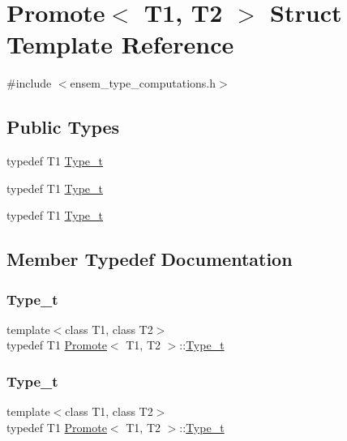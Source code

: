 \hypertarget{structPromote}{}\section{Promote$<$ T1, T2 $>$ Struct Template Reference}
\label{structPromote}


{\ttfamily \#include $<$ensem\+\_\+type\+\_\+computations.\+h$>$}

\subsection*{Public Types}
\begin{DoxyCompactItemize}
\item 
typedef T1 \mbox{\hyperlink{structPromote_a85c0d5fa03b60c087ac52aab76ccb930}{Type\+\_\+t}}
\item 
typedef T1 \mbox{\hyperlink{structPromote_a85c0d5fa03b60c087ac52aab76ccb930}{Type\+\_\+t}}
\item 
typedef T1 \mbox{\hyperlink{structPromote_a85c0d5fa03b60c087ac52aab76ccb930}{Type\+\_\+t}}
\end{DoxyCompactItemize}


\subsection{Member Typedef Documentation}
\mbox{\label{structPromote_a85c0d5fa03b60c087ac52aab76ccb930}} 
\subsubsection{\texorpdfstring{Type\_t}{Type\_t}\hspace{0.1cm}{\footnotesize\ttfamily [1/3]}}
{\footnotesize\ttfamily template$<$class T1, class T2$>$ \\
typedef T1 \mbox{\hyperlink{structPromote}{Promote}}$<$ T1, T2 $>$\+::\mbox{\hyperlink{structPromote_a85c0d5fa03b60c087ac52aab76ccb930}{Type\+\_\+t}}}

\mbox{\label{structPromote_a85c0d5fa03b60c087ac52aab76ccb930}} 
\subsubsection{\texorpdfstring{Type\_t}{Type\_t}\hspace{0.1cm}{\footnotesize\ttfamily [2/3]}}
{\footnotesize\ttfamily template$<$class T1, class T2$>$ \\
typedef T1 \mbox{\hyperlink{structPromote}{Promote}}$<$ T1, T2 $>$\+::\mbox{\hyperlink{structPromote_a85c0d5fa03b60c087ac52aab76ccb930}{Type\+\_\+t}}}

